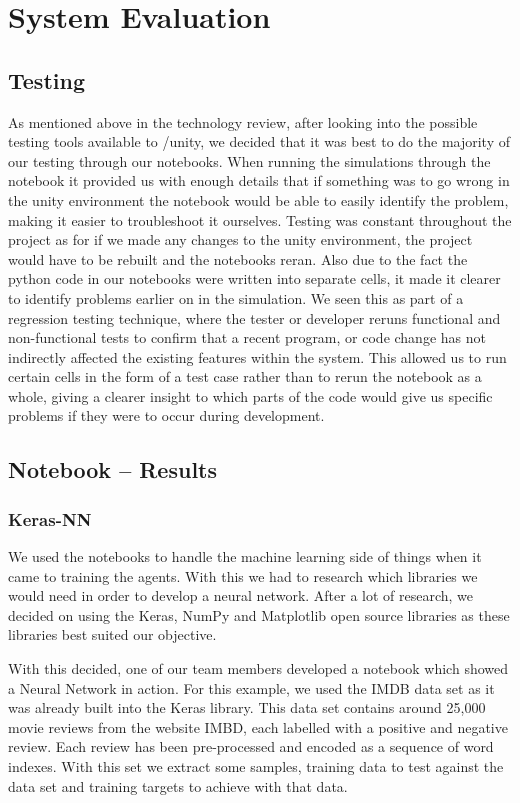 
\chapter{System Evaluation}


\section{Testing}
As mentioned above in the technology review, after looking into the possible testing tools available to /unity, we decided that it was best to do the majority of our testing through our notebooks. When running the simulations through the notebook it provided us with enough details that if something was to go wrong in the unity environment the notebook would be able to easily identify the problem, making it easier to troubleshoot it ourselves. Testing was constant throughout the project as for if we made any changes to the unity environment, the project would have to be rebuilt and the notebooks reran. Also due to the fact the python code in our notebooks were written into separate cells, it made it clearer to identify problems earlier on in the simulation.  We seen this as part of a regression testing technique, where the tester or developer reruns functional and non-functional tests to confirm that a recent program, or code change has not indirectly affected the existing features within the system. This allowed us to run certain cells in the form of a test case rather than to rerun the notebook as a whole, giving a clearer insight to which parts of the code would give us specific problems if they were to occur during development.

\section{Notebook – Results}
\subsection{Keras-NN}
We used the notebooks to handle the machine learning side of things when it came to training the agents. 
With this we had to research which libraries we would need in order to develop a neural network. After a lot of research, we decided on using the Keras, NumPy and Matplotlib open source libraries as these libraries best suited our objective. 

With this decided, one of our team members developed a notebook which showed a Neural Network in action. For this example, we used the IMDB data set as it was already built into the Keras library. This data set contains around 25,000 movie reviews from the website IMBD, each labelled with a positive and negative review. Each review has been pre-processed and encoded as a sequence of word indexes. With this set we extract some samples, training data to test against the data set and training targets to achieve with that data. 

